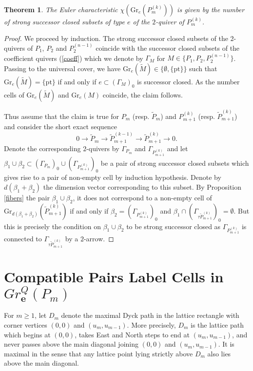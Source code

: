 \documentclass{amsart}
\newtheorem{theorem}{Theorem}[section]
\newcommand{\bfe}{\mathbf{e}}
\newcommand{\pt}{\mathrm{pt}}
\newcommand{\Gr}{\mathrm{Gr}}
\newcommand{\ses}[3]{0\rightarrow #1\rightarrow #2\rightarrow#3\rightarrow 0}
\begin{document}
\begin{theorem}
The Euler characteristic $\chi(\Gr_e(P_m^{(k)}))$ is given by the number of strong successor closed subsets of type $e$ of the $2$-quiver of $P_m^{(k)}$.
\end{theorem}
\begin{proof}
We proceed by induction. The strong successor closed subsets of the $2$-quivers of $P_1$, $P_2$ and $P_2^{(n-1)}$ coincide with the successor closed subsets of the coefficient quivers (\ref{coeff}) which we denote by $\Gamma_M$ for $M\in\{P_1, P_2,P_2^{(n-1)}\}$. Passing to the universal cover, we have $\Gr_e(\tilde M)\in\{\emptyset,\{\pt\}\}$ such that $\Gr_e(\tilde M)=\{\pt\}$ if and only if $e\subset (\Gamma_M)_0$ is successor closed. As the number cells of $\Gr_e(\tilde M)$ and $\Gr_e(M)$ coincide, the claim follows.

Thus assume that the claim is true for $P_m$ (resp. $\tilde P_{m}$) and $P_{m+1}^{(k)}$ (resp. $\tilde P_{m+1}^{(k)}$) and consider the short exact sequence
\[\ses{\tilde P_m}{\tilde P_{m+1}^{(k-1)}}{\tilde P_{m+1}^{(k)}}.\]
Denote the corresponding $2$-quivers by $\Gamma_{P_m}$ and $\Gamma_{P_{m+1}^{(k)}}$ and let $\beta_1\cup\beta_2\subset (\Gamma_{P_m})_0\cup (\Gamma_{P_{m+1}^{(k)}})_0$ be a pair of strong successor closed subsets which gives rise to a pair of non-empty cell by induction hypothesis. Denote by $d(\beta_1+\beta_2)$ the dimension vector corresponding to this subset. By Proposition \ref{fibers} the pair $\beta_1\cup\beta_2$, it does not correspond to a non-empty cell of $\Gr_{d(\beta_1+\beta_2)}(\tilde P_{m+1}^{(k)})$ if and only if $\beta_2=(\Gamma_{P_{m+1}^{(k)}})_0$ and $\beta_1\cap(\Gamma_{\tau\tilde P_{m+1}^{(k)}})_0=\emptyset$. But this is precisely the condition on $\beta_1\cup\beta_2$ to be strong successor closed as $\Gamma_{P_{m+1}^{(k)}}$ is connected to $\Gamma_{\tau\tilde P_{m+1}^{(k)}}$ by a $2$-arrow.

\end{proof}


\section{Compatible Pairs Label Cells in $Gr^Q_\bfe(P_m)$}
For $m\ge1$, let $D_m$ denote the maximal Dyck path in the lattice rectangle with corner vertices $(0,0)$ and $(u_m,u_{m-1})$.  
More precisely, $D_m$ is the lattice path which begins at $(0,0)$, takes East and North steps to end at $(u_m,u_{m-1})$, and never passes above the main diagonal joining $(0,0)$ and $(u_m,u_{m-1})$.  
It is maximal in the sense that any lattice point lying strictly above $D_m$ also lies above the main diagonal.  
\end{document}
